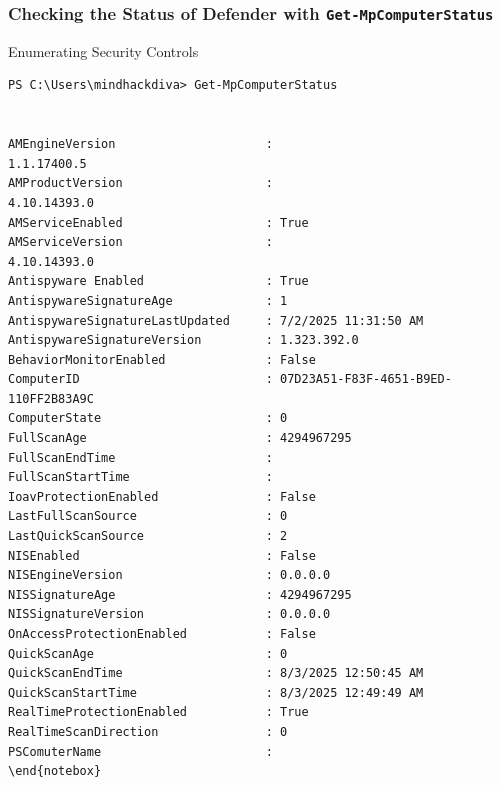 \subsubsection{Checking the Status of Defender with \verb|Get-MpComputerStatus|}
Enumerating Security Controls
\begin{notebox}
\begin{verbatim}
PS C:\Users\mindhackdiva> Get-MpComputerStatus


AMEngineVersion                     :
1.1.17400.5
AMProductVersion                    :
4.10.14393.0
AMServiceEnabled                    : True
AMServiceVersion                    :
4.10.14393.0
Antispyware Enabled                 : True
AntispywareSignatureAge             : 1
AntispywareSignatureLastUpdated     : 7/2/2025 11:31:50 AM
AntispywareSignatureVersion         : 1.323.392.0
BehaviorMonitorEnabled              : False
ComputerID                          : 07D23A51-F83F-4651-B9ED-110FF2B83A9C
ComputerState                       : 0
FullScanAge                         : 4294967295
FullScanEndTime                     :
FullScanStartTime                   :
IoavProtectionEnabled               : False
LastFullScanSource                  : 0
LastQuickScanSource                 : 2
NISEnabled                          : False
NISEngineVersion                    : 0.0.0.0
NISSignatureAge                     : 4294967295
NISSignatureVersion                 : 0.0.0.0
OnAccessProtectionEnabled           : False
QuickScanAge                        : 0
QuickScanEndTime                    : 8/3/2025 12:50:45 AM
QuickScanStartTime                  : 8/3/2025 12:49:49 AM
RealTimeProtectionEnabled           : True
RealTimeScanDirection               : 0
PSComuterName                       :
\end{notebox}
\end{verbatim}
\end{notebox}

